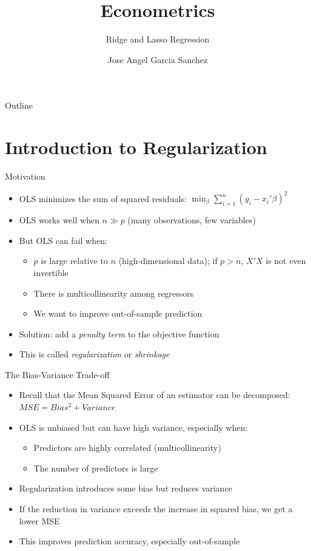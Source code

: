 \documentclass[aspectratio=169]{beamer}
\title{Econometrics}
\subtitle{Ridge and Lasso Regression}
\author{Jose Angel Garcia Sanchez}
\institute{Université Paris 1 Panthéon-Sorbonne}
\date{} %
\begin{document}
{
\begin{frame}
\titlepage
\end{frame}
}

\begin{frame}{Outline}
\tableofcontents
\end{frame}

\section{Introduction to Regularization}

\begin{frame}{Motivation}
\begin{itemize}
    \item OLS minimizes the sum of squared residuals: $\min_{\beta} \sum_{i=1}^{n}(y_i - x_i'\beta)^2$
    \item OLS works well when $n \gg p$ (many observations, few variables)
    \item But OLS can fail when:
    \begin{itemize}
        \item $p$ is large relative to $n$ (high-dimensional data); if $p > n$, $X'X$ is not even invertible
        \item There is multicollinearity among regressors
        \item We want to improve out-of-sample prediction
    \end{itemize}
    \item Solution: add a \textit{penalty term} to the objective function
    \item This is called \textit{regularization} or \textit{shrinkage}
\end{itemize}
\end{frame}

\begin{frame}{The Bias-Variance Trade-off}
\begin{itemize}
    \item Recall that the Mean Squared Error of an estimator can be decomposed: $MSE = Bias^2 + Variance$
    \item OLS is unbiased but can have high variance, especially when:
    \begin{itemize}
        \item Predictors are highly correlated (multicollinearity)
        \item The number of predictors is large
    \end{itemize}
    \item Regularization introduces some bias but reduces variance
    \item If the reduction in variance exceeds the increase in squared bias, we get a lower MSE
    \item This improves prediction accuracy, especially out-of-sample
\end{itemize}
\end{frame}
\end{document}
